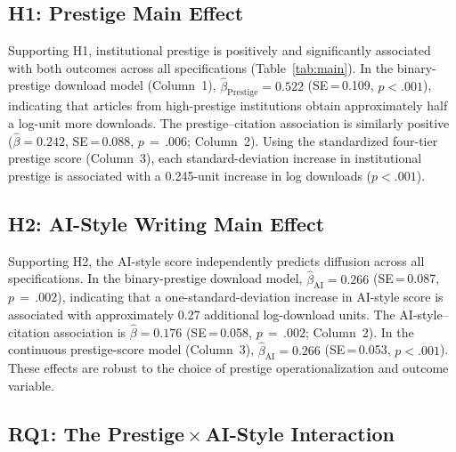 \documentclass[12pt,a4paper]{article}
\begin{document}
\subsection{H1: Prestige Main Effect}

Supporting H1, institutional prestige is positively and significantly
associated with both outcomes across all specifications
(Table~\ref{tab:main}).
In the binary-prestige download model (Column~1),
$\hat{\beta}_{\text{Prestige}} = 0.522$ (SE\,=\,0.109, $p<.001$),
indicating that articles from high-prestige institutions obtain
approximately half a log-unit more downloads.
The prestige--citation association is similarly positive
($\hat{\beta} = 0.242$, SE\,=\,0.088, $p\,=\,.006$; Column~2).
Using the standardized four-tier prestige score (Column~3), each
standard-deviation increase in institutional prestige is associated
with a 0.245-unit increase in log downloads ($p<.001$).

\subsection{H2: AI-Style Writing Main Effect}

Supporting H2, the AI-style score independently predicts diffusion
across all specifications.
In the binary-prestige download model,
$\hat{\beta}_{\text{AI}} = 0.266$ (SE\,=\,0.087, $p\,=\,.002$),
indicating that a one-standard-deviation increase in AI-style score
is associated with approximately 0.27 additional log-download units.
The AI-style--citation association is
$\hat{\beta} = 0.176$ (SE\,=\,0.058, $p\,=\,.002$; Column~2).
In the continuous prestige-score model (Column~3),
$\hat{\beta}_{\text{AI}} = 0.266$ (SE\,=\,0.053, $p<.001$).
These effects are robust to the choice of prestige operationalization
and outcome variable.

\subsection{RQ1: The Prestige\,$\times$\,AI-Style Interaction}
\end{document}
